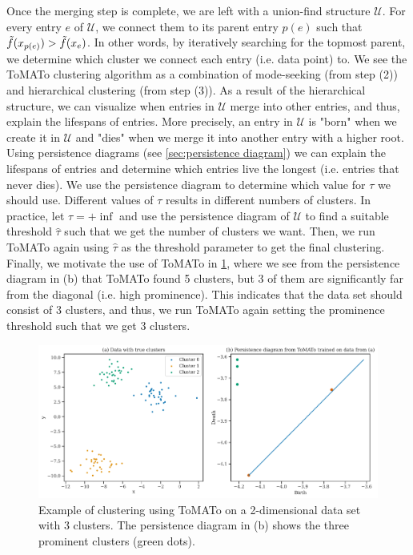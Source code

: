 Once the merging step is complete, we are left with a union-find structure $\mathcal{U}$. For every entry $e$ of $\mathcal{U}$, we connect them to its parent entry $p(e)$ such that $\Tilde{f}(x_{p(e)}) > \Tilde{f}(x_e)$. In other words, by iteratively searching for the topmost parent, we determine which cluster we connect each entry (i.e. data point) to. We see the ToMATo clustering algorithm as a combination of mode-seeking (from step (2)) and hierarchical clustering (from step (3)). As a result of the hierarchical structure, we can visualize when entries in $\mathcal{U}$ merge into other entries, and thus, explain the lifespans of entries. More precisely, an entry in $\mathcal{U}$ is "born" when we create it in $\mathcal{U}$ and "dies" when we merge it into another entry with a higher root. Using persistence diagrams (see \cref{sec:persistence diagram}) we can explain the lifespans of entries and determine which entries live the longest (i.e. entries that never dies). We use the persistence diagram to determine which value for $\tau$ we should use. Different values of $\tau$ results in different numbers of clusters. In practice, let $\tau = +\inf$ and use the persistence diagram of $\mathcal{U}$ to find a suitable threshold $\hat{\tau}$ such that we get the number of clusters we want. Then, we run ToMATo again using $\hat{\tau}$ as the threshold parameter to get the final clustering. Finally, we motivate the use of ToMATo in \cref{fig:k-tomato-clustering-2d-example}, where we see from the persistence diagram in (b) that ToMATo found 5 clusters, but 3 of them are significantly far from the diagonal (i.e. high prominence). This indicates that the data set should consist of 3 clusters, and thus, we run ToMATo again setting the prominence threshold such that we get 3 clusters.
\begin{figure}[H]
    \centering
    \includegraphics[width=\textwidth]{thesis/figures/k-tomato-clustering-2d-example.pdf}
    \caption{Example of clustering using ToMATo on a 2-dimensional data set with 3 clusters. The persistence diagram in (b) shows the three prominent clusters (green dots).}
    \label{fig:k-tomato-clustering-2d-example}
\end{figure}


